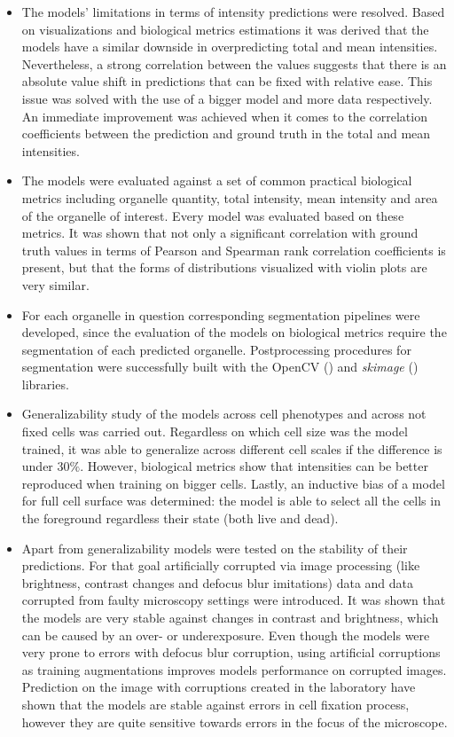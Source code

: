 \begin{itemize}
    \item The models' limitations in terms of intensity predictions were resolved. Based on visualizations and biological metrics estimations it was derived that the models have a similar downside in overpredicting total and mean intensities. Nevertheless, a strong correlation between the values suggests that there is an absolute value shift in predictions that can be fixed with relative ease. This issue was solved with the use of a bigger model and more data respectively. An immediate improvement was achieved when it comes to the correlation coefficients between the prediction and ground truth in the total and mean intensities.
    
    \item The models were evaluated against a set of common practical biological metrics including organelle quantity, total intensity, mean intensity and area of the organelle of interest. Every model was evaluated based on these metrics. It was shown that not only a significant correlation with ground truth values in terms of Pearson and Spearman rank correlation coefficients is present, but that the forms of distributions visualized with violin plots are very similar.
    
    \item For each organelle in question corresponding segmentation pipelines were developed, since the evaluation of the models on biological metrics require the segmentation of each predicted organelle. Postprocessing procedures for segmentation were successfully built with the OpenCV (\cite{opencv}) and \textit{skimage} (\cite{scikit}) libraries. 
    
    \item Generalizability study of the models across cell phenotypes and across not fixed cells was carried out. Regardless on which cell size was the model trained, it was able to generalize across different cell scales if the difference is under $30\%$. However, biological metrics show that intensities can be better reproduced when training on bigger cells. Lastly, an inductive bias of a model for full cell surface was determined: the model is able to select all the cells in the foreground regardless their state (both live and dead).

    \item Apart from generalizability models were tested on the stability of their predictions. For that goal artificially corrupted via image processing (like brightness, contrast changes and defocus blur imitations) data and data corrupted from faulty microscopy settings were introduced. It was shown that the models are very stable against changes in contrast and brightness, which can be caused by an over- or underexposure. Even though the models were very prone to errors with defocus blur corruption, using artificial corruptions as training augmentations improves models performance on corrupted images. Prediction on the image with corruptions created in the laboratory have shown that the models are stable against errors in cell fixation process, however they are quite sensitive towards errors in the focus of the microscope.
    

\end{itemize}
